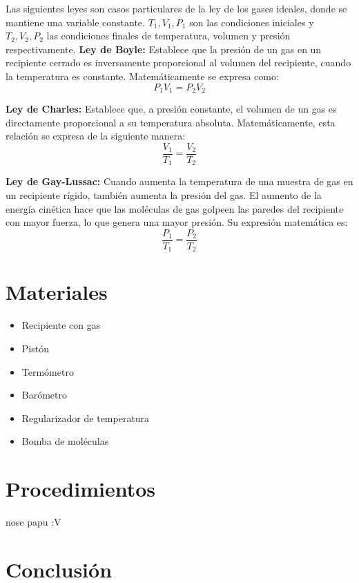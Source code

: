 \documentclass[12pt]{article}
\begin{document}
Las siguientes leyes son casos particulares de la ley de los gases ideales,
donde se mantiene una variable constante. $T_1, V_1, P_1$ son las condiciones
iniciales y $T_2, V_2, P_2$ las condiciones finales de temperatura, 
volumen y presión respectivamente.
\newpage
\textbf{Ley de Boyle:} Establece que la presión de un gas en un recipiente 
cerrado es inversamente proporcional al volumen del recipiente, cuando la 
temperatura es constante. \parencite{educaplusleyboyle} Matemáticamente se 
expresa como:
\[
P_1V_1=P_2V_2
\]

\textbf{Ley de Charles:} Establece que, a presión 
constante, el volumen de un gas es directamente proporcional a su 
temperatura absoluta. \parencite{masamleycharles} Matemáticamente, esta 
relación se expresa de la siguiente manera:
\[
\dfrac{V_1}{T_1}=\dfrac{V_2}{T_2}
\]

\textbf{Ley de Gay-Lussac:} Cuando aumenta la temperatura de una muestra 
de gas en un recipiente rígido, también aumenta la presión del gas. El 
aumento de la energía cinética hace que las moléculas de gas golpeen las 
paredes del recipiente con mayor fuerza, lo que genera una mayor presión.
\parencite{libretextsgaylussac} Su expresión matemática es:
\[
\dfrac{P_1}{T_1}=\dfrac{P_2}{T_2}
\]

\section*{Materiales}
\begin{itemize}
    \item Recipiente con gas
    \item Pistón
    \item Termómetro
    \item Barómetro
    \item Regularizador de temperatura
    \item Bomba de moléculas
\end{itemize}

\section*{Procedimientos}
nose papu :V
\section*{Conclusión}


\newpage
\printbibliography[heading=bibintoc]
\end{document}
